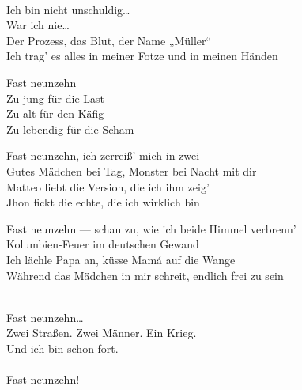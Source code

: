 \begin{lyrics}
\\
Ich bin nicht unschuldig…\\
War ich nie…\\
Der Prozess, das Blut, der Name „Müller“\\
Ich trag’ es alles in meiner Fotze und in meinen Händen

Fast neunzehn\\
Zu jung für die Last\\
Zu alt für den Käfig\\
Zu lebendig für die Scham

Fast neunzehn, ich zerreiß’ mich in zwei\\
Gutes Mädchen bei Tag, Monster bei Nacht mit dir\\
Matteo liebt die Version, die ich ihm zeig’\\
Jhon fickt die echte, die ich wirklich bin

Fast neunzehn — schau zu, wie ich beide Himmel verbrenn’\\
Kolumbien-Feuer im deutschen Gewand\\
Ich lächle Papa an, küsse Mamá auf die Wange\\
Während das Mädchen in mir schreit, endlich frei zu sein

\\
Fast neunzehn…\\
Zwei Straßen. %
Zwei Männer. %
Ein Krieg.\\
Und ich bin schon fort.\\
\\
Fast neunzehn!

\end{lyrics}

